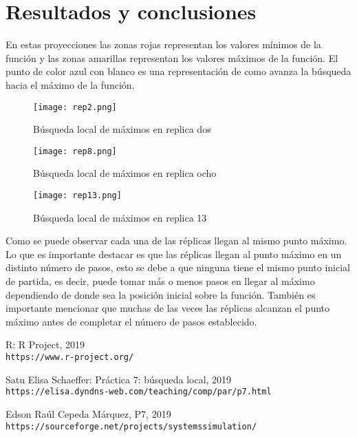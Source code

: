 \documentclass{article}
\begin{document}
\section{Resultados y conclusiones}
En estas proyecciones las zonas rojas representan los valores mínimos de la función y las zonas amarillas representan los valores máximos de la función.
El punto de color azul con blanco es una representación de como avanza la búsqueda hacia el máximo de la función.

\begin{figure}[H]
\centering
\texttt{[image: rep2.png]}
\caption{Búsqueda local de máximos en replica dos}
\label{g1}
\end{figure}

\begin{figure}[H]
\centering
\texttt{[image: rep8.png]}
\caption{Búsqueda local de máximos en replica ocho}
\label{g2}
\end{figure}

\begin{figure}[H]
\centering
\texttt{[image: rep13.png]}
\caption{Búsqueda local de máximos en replica 13}
\label{g3}
\end{figure}

Como se puede observar cada una de las réplicas llegan al mismo punto máximo.
Lo que es importante destacar es que las réplicas llegan al punto máximo en un distinto número de pasos, esto se debe a que ninguna tiene el mismo punto inicial de partida, es decir, puede tomar más o menos pasos en llegar al máximo dependiendo de donde sea la posición inicial sobre la función.
También es importante mencionar que muchas de las veces las réplicas alcanzan el punto máximo antes de completar el número de pasos establecido.






\begin{thebibliography}{9}

R:  R Project, 2019
\\\texttt{https://www.r-project.org/}

Satu Elisa Schaeffer: Práctica 7: búsqueda local, 2019
\\\texttt{https://elisa.dyndns-web.com/teaching/comp/par/p7.html}

Edson Raúl Cepeda Márquez, P7, 2019
\\\texttt{https://sourceforge.net/projects/systemssimulation/}



\end{thebibliography}
\end{document}
